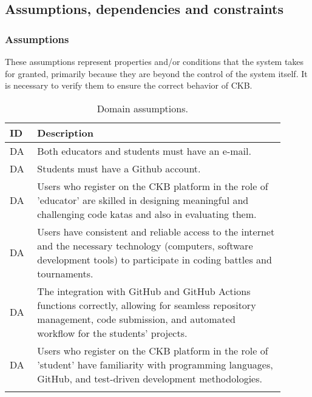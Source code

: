 \newpage
\subsection{Assumptions, dependencies and constraints}
\subsubsection{Assumptions}
These assumptions represent properties and/or conditions that the system takes for granted, primarily because they are beyond the control of the system itself. It is necessary to verify them to ensure the correct behavior of CKB.
\label{sec:assumptions_dependencies_and_constraints}%
\setcounter{da}{0}
\newcommand{\cda}{\stepcounter{da}\theda}
\begin{center}
    \begin{longtable}{ |l|p{0.9\linewidth}| }
        \hline
        \textbf{ID} & \textbf{Description}                                                                                     \\
        \hline
        DA\cda      & Both educators and students must have an e-mail.                                         \\
         \hline
        DA\cda      & Students must have a  Github account.                                         \\
        \hline
        DA\cda      & Users who register on the CKB platform in the role of 'educator' are skilled  in designing meaningful and challenging code katas and also in evaluating them.                                                                           \\
        \hline
        DA\cda      & Users have consistent and reliable access to the internet and the necessary technology (computers, software development tools) to participate in coding battles and tournaments.                                                       \\
        \hline
        DA\cda      & The integration with GitHub and GitHub Actions functions correctly, allowing for seamless repository management, code submission, and automated workflow for the students’ projects.                                  \\
        \hline
        DA\cda      & Users who register on the CKB platform in the role of 'student'  have familiarity with programming languages,  GitHub, and test-driven development methodologies.        \\
        \hline
        \caption{Domain assumptions.}
        \label{tab:domainassmptn_tab}%
\end{longtable}
\end{center}


